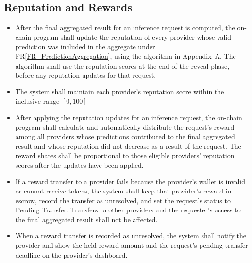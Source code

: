 \documentclass[12pt]{article}
\newcounter{reqnum} %
\newcommand{\rref}[1]{FR\ref{#1}}
\begin{document}
\subsection{Reputation and Rewards}

\noindent \begin{itemize}

\item[FR\refstepcounter{reqnum}\thereqnum \label{FR_UpdateProviderReputations}:] After the final aggregated result for an inference request is computed, the on-chain program shall update the reputation of every provider whose valid prediction was included in the aggregate under \rref{FR_PredictionAggregation}, using the  algorithm in Appendix~A. The algorithm shall use the reputation scores at the end of the reveal phase, before any reputation updates for that request.

\item[FR\refstepcounter{reqnum}\thereqnum \label{FR_ReputationRange}:] The system shall maintain each provider's reputation score within the inclusive range $[0,100]$

\item[FR\refstepcounter{reqnum}\thereqnum \label{FR_DistributeRewards}:] After applying the reputation updates for an inference request, the on-chain program shall calculate and automatically distribute the request's reward among all providers whose predictions contributed to the final aggregated result and whose reputation did not decrease as a result of the request. The reward shares shall be proportional to those eligible providers' reputation scores after the updates have been applied.

\item[FR\refstepcounter{reqnum}\thereqnum \label{FR_RewardTransferFailure}:] If a reward transfer to a provider fails because the provider's wallet is invalid or cannot receive tokens, the system shall keep that provider's reward in escrow, record the transfer as unresolved, and set the request's status to Pending Transfer. Transfers to other providers and the requester's access to the final aggregated result shall not be affected.

\item[FR\refstepcounter{reqnum}\thereqnum \label{FR_PendingTransferNotice}:] When a reward transfer is recorded as unresolved, the system shall notify the provider and show the held reward amount and the request's pending transfer deadline on the provider's dashboard.


\end{itemize}
\end{document}
